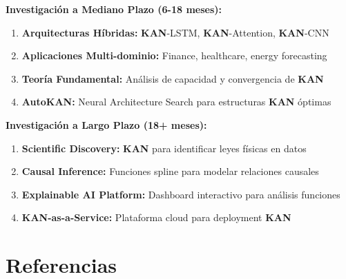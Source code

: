 \documentclass[10pt,twocolumn]{article}
\newcommand{\kan}{\textbf{KAN}}
\begin{document}
\textbf{Investigación a Mediano Plazo (6-18 meses):}
\begin{enumerate}
    \item \textbf{Arquitecturas Híbridas:} \kan-LSTM, \kan-Attention, \kan-CNN
    \item \textbf{Aplicaciones Multi-dominio:} Finance, healthcare, energy forecasting
    \item \textbf{Teoría Fundamental:} Análisis de capacidad y convergencia de \kan
    \item \textbf{AutoKAN:} Neural Architecture Search para estructuras \kan{} óptimas
\end{enumerate}

\textbf{Investigación a Largo Plazo (18+ meses):}
\begin{enumerate}
    \item \textbf{Scientific Discovery:} \kan{} para identificar leyes físicas en datos
    \item \textbf{Causal Inference:} Funciones spline para modelar relaciones causales
    \item \textbf{Explainable AI Platform:} Dashboard interactivo para análisis funciones
    \item \textbf{KAN-as-a-Service:} Plataforma cloud para deployment \kan
\end{enumerate}

\section{Referencias}
\end{document}
